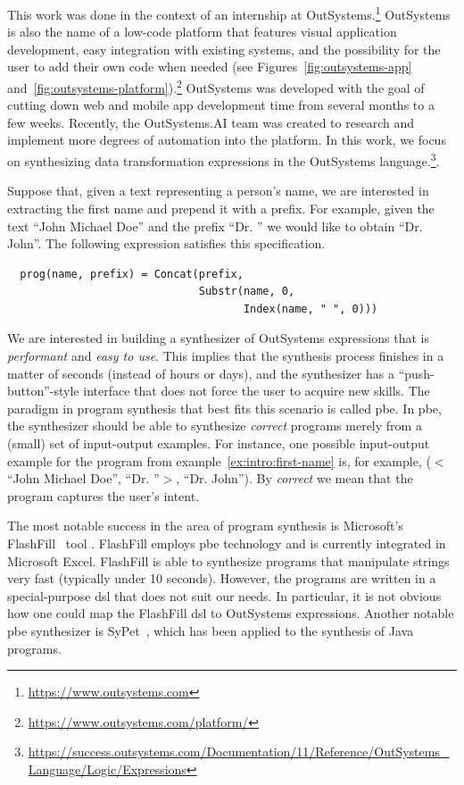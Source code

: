 This work was done in the context of an internship at
OutSystems.\footnote{\url{https://www.outsystems.com}}
OutSystems is also the name of a low-code platform that features visual
application development, easy integration with existing systems, and the
possibility for the user to add their own code when needed (see
Figures~\ref{fig:outsystems-app} and~\ref{fig:outsystems-platform}).\footnote{\url{https://www.outsystems.com/platform/}}
OutSystems was developed with the goal of cutting down web and mobile app
development time from several months to a few weeks.
Recently, the OutSystems.AI team was created to research and implement more
degrees of automation into the platform.
In this work, we focus on synthesizing data transformation expressions in the
OutSystems language.\footnote{\url{https://success.outsystems.com/Documentation/11/Reference/OutSystems_Language/Logic/Expressions}}.

\begin{example}\label{ex:intro:first-name}
  Suppose that, given a text representing a person's name, we are interested in
extracting the first name and prepend it with a prefix. For example, given the
text ``John Michael Doe'' and the prefix ``Dr. '' we would like to obtain
``Dr. John''. The following expression satisfies this specification.
 
\begin{lstlisting}
  prog(name, prefix) = Concat(prefix,
                              Substr(name, 0,
                                     Index(name, " ", 0)))
\end{lstlisting}
\end{example}

\noindent
We are interested in building a synthesizer of OutSystems expressions that is
\textit{performant} and \textit{easy to use}.
This implies that the synthesis process finishes in a matter of seconds
(instead of hours or days), and the synthesizer has a ``push-button''-style
interface that does not force the user to acquire new skills.
The paradigm in program synthesis that best fits this scenario is called
\gls{pbe}.
In \gls{pbe}, the synthesizer should be able to synthesize \textit{correct}
programs merely from a (small) set of input-output examples.
For instance, one possible input-output example for the program from
example~\ref{ex:intro:first-name} is, for example, ($<$``John Michael Doe'', ``Dr.
''$>$, ``Dr. John'').
By \textit{correct} we mean that the program captures the user's intent.

The most notable success in the area of program synthesis is Microsoft's
FlashFill~\cite{Gulwani:2011} tool .
FlashFill employs \gls{pbe} technology and is currently integrated in Microsoft
Excel.
FlashFill is able to synthesize programs that manipulate strings very fast
(typically under 10 seconds).
However, the programs are written in a special-purpose \gls{dsl} that does not
suit our needs.
In particular, it is not obvious how one could map the FlashFill \gls{dsl} to
OutSystems expressions.
Another notable \gls{pbe} synthesizer is SyPet~\cite{Feng:2017:CSC}, which has
been applied to the synthesis of Java programs.

